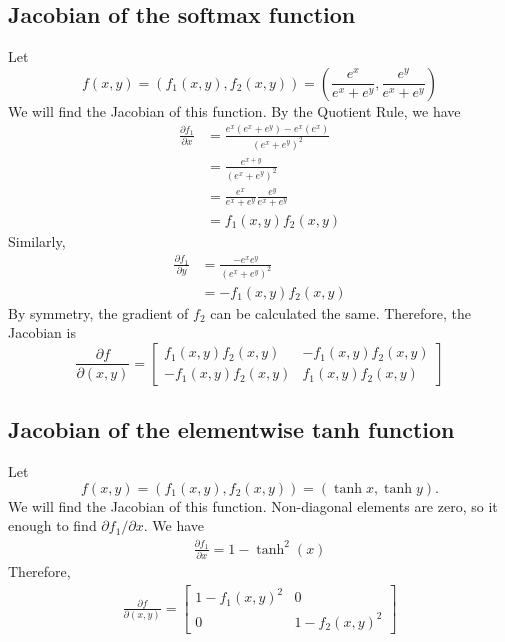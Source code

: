 \documentclass[
	12pt, %
]{../Template/fphw}
\begin{document}
\subsection*{Jacobian of the softmax function} Let 
\begin{equation}
    f(x,y) = (f_1(x,y),f_2(x,y))=\left( \frac{e^{x}}{e^{x}+e^{y}},\frac{e^{y}}{e^{x}+e^{y}} \right)
\end{equation}
We will find the Jacobian of this function. By the Quotient Rule, we have
\begin{align}
    \frac{\partial f_1}{\partial x} &= \frac{e^x(e^x+e^y)-e^x(e^x)}{(e^x+e^y)^2} \\ &= \frac{e^{x+y}}{(e^x+e^y)^2} \\
    &= \frac{e^x}{e^x+e^y}\frac{e^y}{e^x+e^y} \\ &= f_1(x,y)f_2(x,y)
\end{align}
Similarly,
\begin{align}
        \frac{\partial f_1}{\partial y} &= \frac{-e^x e^y}{(e^x+e^y)^2} \\ &=
        -f_1(x,y)f_2(x,y)
\end{align}
By symmetry, the gradient of $f_2$ can be calculated the same. Therefore, the Jacobian is
\begin{equation}
    \frac{\partial f}{\partial (x,y)} = \begin{bmatrix}
        f_1(x,y)f_2(x,y) & - f_1(x,y)f_2(x,y) \\
        -f_1(x,y)f_2(x,y) & f_1(x,y)f_2(x,y)
    \end{bmatrix}
\end{equation}

\subsection*{Jacobian of the elementwise tanh function} Let
\begin{equation}
    f(x,y) =(f_1(x,y), f_2(x,y)) = (\tanh{x},\tanh{y}). 
\end{equation}
We will find the Jacobian of this function. Non-diagonal elements are zero, so it enough to find $\partial f_1/\partial x$. We have
\begin{align}
    \frac{\partial f_1}{\partial x} = 1-\tanh^{2}(x)
\end{align}
Therefore,
\begin{align}
    \frac{\partial f}{\partial (x,y)} = \begin{bmatrix}
        1-f_1(x,y)^2 & 0 \\ 0 & 1-f_2(x,y)^2
    \end{bmatrix}
\end{align}

\end{document}
